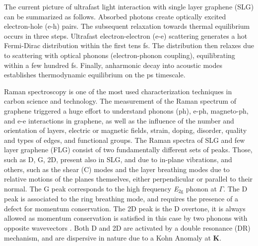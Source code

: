 \documentclass[aps, prl,twocolumn]{revtex4}
\begin{document}
The current picture of ultrafast light interaction with single layer graphene (SLG) can be summarized as follows\cite{Brida2013}. Absorbed photons create optically excited electron-hole (e-h) pairs. The subsequent relaxation towards thermal equilibrium occurs in three steps. Ultrafast electron-electron (e-e) scattering generates a hot Fermi-Dirac distribution within the first tens fs\cite{Tomadin2013}. The distribution then relaxes due to scattering with optical phonons (electron-phonon coupling), equilibrating within a few hundred fs\cite{Lazzeri2005, Butscher2007}. Finally, anharmonic decay into acoustic modes establishes thermodynamic equilibrium on the ps timescale\cite{Lui2010, Wu2012, Bonini2007}.

Raman spectroscopy is one of the most used characterization techniques in carbon science and technology\cite{FerrRob2004}. The measurement of the Raman spectrum of graphene\cite{FerrariPRL2006} triggered a huge effort to understand phonons (ph), e-ph, magneto-ph, and e-e interactions in graphene, as well as the influence of the number and orientation of layers, electric or magnetic fields, strain, doping, disorder, quality and types of edges, and functional groups\cite{FerrariNN2013, Malard2009, Froehlicher2015}. The Raman spectra of SLG and few layer graphene (FLG) consist of two fundamentally different sets of peaks. Those, such as D, G, 2D, present also in SLG, and due to in-plane vibrations\cite{FerrariPRL2006}, and others, such as the shear (C) modes\cite{Tan2012} and the layer breathing modes\cite{Sato2011,Lui2012} due to relative motions of the planes themselves, either perpendicular or parallel to their normal. The G peak corresponds to the high frequency \textit{E}$_{\mathrm{2g}}$ phonon at $\Gamma$. The D peak is associated to the ring breathing mode, and requires the presence of a defect for momentum conservation\cite{Tuinstra1970, Thomsen2000, FerrariPRB2000}. The 2D peak is the D overtone, it is always allowed as momentum conservation is satisfied in this case by two phonons with opposite wavevectors \cite{FerrariPRL2006}. Both D and 2D are activated by a double resonance (DR) mechanism, and are dispersive in nature due to a Kohn Anomaly at \textbf{K}\cite{Piscanec2004}.
\end{document}
